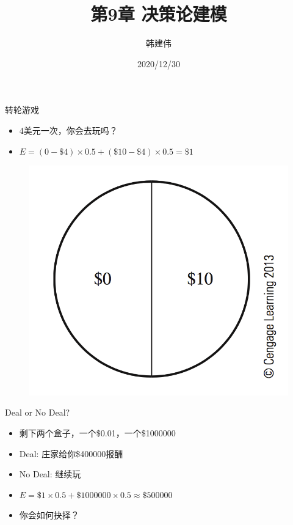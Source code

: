 \documentclass[UTF8]{ctexbeamer}
\title{第9章 决策论建模}
\author{韩建伟}
\institute{
  信息学院\\
  \texttt{hanjianwei@zjgsu.edu.cn}
}
\date{2020/12/30}
\begin{document}
\begin{frame}[plain]
  \titlepage{}
\end{frame}

\begin{frame}{转轮游戏}

  \begin{itemize}
  \item<1-> 4美元一次，你会去玩吗？
  \item<2-> $E = (0-\$4) \times 0.5 + (\$10 - \$4) \times 0.5 = \$1$
  \end{itemize}

  \begin{figure}
    \centering
    \includegraphics[height=.4\textheight{}]{9_1.png}
  \end{figure}
  
\end{frame}

\begin{frame}{Deal or No Deal?}

  \begin{itemize}
  \item<1-> 剩下两个盒子，一个\$0.01，一个\$1000000
  \item<1-> Deal: 庄家给你\$400000报酬
  \item<1-> No Deal: 继续玩
  \item<2-> $E = \$1 \times 0.5 + \$1000000 \times 0.5 \approx \$500000$
  \item<3-> 你会如何抉择？
  \end{itemize}
  
\end{frame}
\end{document}
